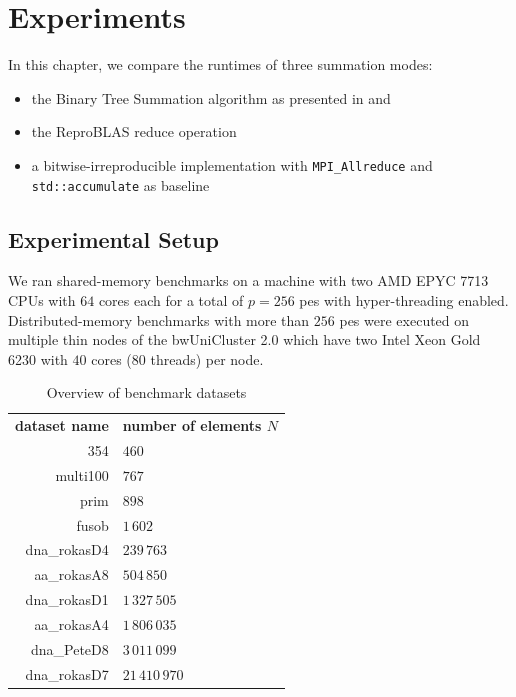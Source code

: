 \chapter{Experiments}
\label{ch:Experiments}

In this chapter, we compare the runtimes of three summation modes:
\begin{itemize}
  \item the Binary Tree Summation algorithm as presented in  and 
  \item the ReproBLAS reduce operation
  \item a bitwise-irreproducible implementation with \texttt{MPI\_Allreduce} and \texttt{std::accumulate} as baseline
\end{itemize}

\section{Experimental Setup}
\label{sec:ExperimentalSetup}
We ran shared-memory benchmarks on a machine with two AMD EPYC 7713 CPUs with $64$ cores each for a total of $p=256$ \glspl{pe} with hyper-threading enabled.
Distributed-memory benchmarks with more than $256$ \glspl{pe} were executed on multiple thin nodes of the bwUniCluster 2.0 which have two Intel Xeon Gold 6230  with $40$ cores ($80$ threads) per node.


\begin{table}
\centering
\begin{tabular}{r|l}
\textbf{dataset name} & \textbf{number of elements $N$} \\
354 & $460$ \\
multi100 & $767$ \\
prim & $898$ \\
fusob & $1\,602$ \\
dna\_rokasD4 & $239\,763$ \\
aa\_rokasA8 & $504\,850$ \\
dna\_rokasD1 & $1\,327\,505$ \\
aa\_rokasA4 & $1\,806\,035$ \\
dna\_PeteD8 & $3\,011\,099$ \\
dna\_rokasD7 & $21\,410\,970$ \\
\end{tabular}
\caption{Overview of benchmark datasets}
\label{table:datasets}
\end{table}

